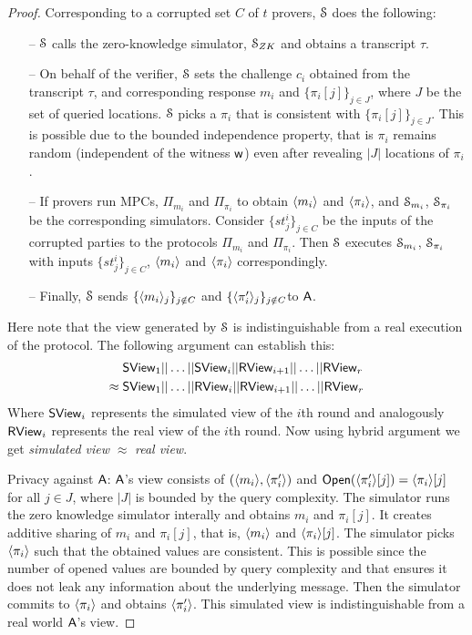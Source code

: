 \begin{proof}
	Corresponding to a corrupted set $C$ of $t$ provers, $\mathcal{S}$ does the following:
	\begin{itemize}
		\item[--] $\mathcal{S}$ calls the zero-knowledge simulator, $\mathcal{S}_{ZK}$ and obtains a transcript $\tau$.
		\item[--] On behalf of the verifier, $\mathcal{S}$ sets the challenge $c_i$ obtained from the transcript $\tau$, and corresponding response $m_i$ and $\{\pi_i[j]\}_{j\in J}$, where $J$ be the set of queried locations. $\mathcal{S}$ picks a $\pi_i$ that is consistent with $\{\pi_i[j]\}_{j\in J}$. This is possible due to the bounded independence property, that is $\pi_i$ remains random (independent of the witness $\mathsf{w}$) even after revealing $|J|$ locations of $\pi_i$.
		\item[--] If provers run MPCs, $\Pi_{m_i}$ and $\Pi_{\pi_i}$ to obtain $\langle m_i \rangle$ and $\langle \pi_i \rangle$, and $\mathcal{S}_{m_i}$, $\mathcal{S}_{\pi_i}$ be the corresponding simulators. Consider $\{st^i_j\}_{j\in C}$ be the inputs of the corrupted parties to the protocols $\Pi_{m_i}$ and $\Pi_{\pi_i}$. Then $\mathcal{S}$ executes $\mathcal{S}_{m_i}$, $\mathcal{S}_{\pi_i}$  with inputs $\{st^i_j\}_{j\in C}$, $\langle m_i \rangle$ and $\langle \pi_i \rangle$ correspondingly.
		\item[--] Finally, $\mathcal{S}$ sends $\{\langle m_i \rangle_j\}_{j\notin C}$ and $\{\langle \pi'_i \rangle_j\}_{j\notin C}$to $\mathsf{A}$.
	\end{itemize}
	Here note that the view generated by $\mathcal{S}$ is indistinguishable from a real execution of the protocol. The following argument can establish this:
	\begin{align*}
	& \mathsf{S View}_1 || \ldots ||\mathsf{S View}_i || \mathsf{R View}_{i+1}|| \ldots || \mathsf{R View}_r \\
	\approx\; 
	& \mathsf{S View}_1 || \ldots ||\mathsf{R View}_i || \mathsf{R View}_{i+1}|| \ldots || \mathsf{R View}_r 
	\end{align*}
	Where $\mathsf{S View}_i$ represents the simulated view of the $i$th round and analogously $\mathsf{R View}_i$ represents the real view of the $i$th round.
	Now using hybrid argument we get \textit{simulated view} $\approx$ \textit{real view}.
	
	Privacy against $\mathsf{A}$: $\mathsf{A}$'s view consists of $(\langle m_i \rangle, \langle \pi'_i \rangle)$ and $\mathsf{Open}(\langle \pi'_i \rangle[j]) = \langle \pi_i \rangle[j]$ for all $j \in J$, where $|J|$ is bounded by the query complexity. 
	The simulator runs the zero knowledge simulator interally and obtains $m_i$ and $\pi_i[j]$. It creates additive sharing of $m_i$ and $\pi_i[j]$, that is, $\langle m_i \rangle$ and $\langle \pi_i \rangle[j]$. The simulator picks $\langle \pi_i \rangle$ such that the obtained values are consistent. This is possible since the number of opened values are bounded by query complexity and that ensures it does not leak any information about the underlying message. Then the simulator commits to $\langle \pi_i \rangle$ and obtains $\langle \pi'_i \rangle$. This simulated view is indistinguishable from a real world $\mathsf{A}$'s view.
\end{proof}
